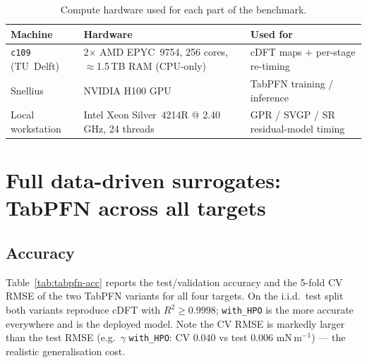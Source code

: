 \documentclass[11pt]{article}
\newcommand{\gmm}{mN\,m$^{-1}$}
\begin{document}
\begin{table}[h]
\centering
\caption{Compute hardware used for each part of the benchmark.}
\label{tab:hw}
\small
\begin{tabular}{lll}
\toprule
Machine & Hardware & Used for \\
\midrule
\texttt{c109} (TU~Delft) & 2$\times$ AMD EPYC~9754, 256 cores, $\approx$1.5\,TB RAM (CPU-only) & cDFT maps + per-stage re-timing \\
Snellius                 & NVIDIA H100 GPU & TabPFN training / inference \\
Local workstation        & Intel Xeon Silver~4214R @ 2.40\,GHz, 24 threads & GPR / SVGP / SR residual-model timing \\
\bottomrule
\end{tabular}
\end{table}

\section{Full data-driven surrogates: TabPFN across all targets}

\subsection{Accuracy}
Table~\ref{tab:tabpfn-acc} reports the test/validation accuracy and the 5-fold
CV RMSE of the two TabPFN variants for all four targets. On the i.i.d.\ test
split both variants reproduce cDFT with $R^2\ge0.9998$; \texttt{with\_HPO} is
the more accurate everywhere and is the deployed model. Note the CV RMSE is
markedly larger than the test RMSE (e.g.\ $\gamma$ \texttt{with\_HPO}: CV
$0.040$ vs test $0.006$ \gmm) --- the realistic generalisation cost.
\end{document}
